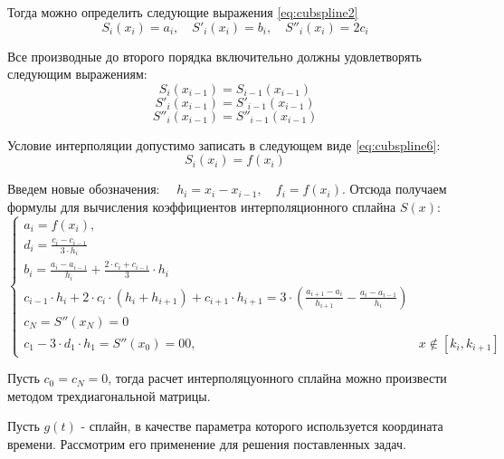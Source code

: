 Тогда можно определить следующие выражения \ref{eq:cubspline2}
\begin{equation} \label{eq:cubspline1}
    S_i\left(x_i\right) = a_i, \quad S'_i(x_i) = b_i, \quad S''_i(x_i) = 2c_i
\end{equation}

Все производные до второго порядка включительно должны удовлетворять следующим выражениям:
\begin{equation} \label{eq:cubspline3}
    S_i\left(x_{i-1}\right) = S_{i-1}(x_{i-1})
\end{equation}
\begin{equation} \label{eq:cubspline4}
    S'_i\left(x_{i-1}\right) = S'_{i-1}(x_{i-1})
\end{equation}
\begin{equation} \label{eq:cubspline5}
    S''_i\left(x_{i-1}\right) = S''_{i-1}(x_{i-1})
\end{equation}

Условие интерполяции допустимо записать в следующем виде \ref{eq:cubspline6}:
\begin{equation} \label{eq:cubspline6}
    S_i\left(x_{i}\right) = f(x_{i})
\end{equation}

Введем новые обозначения: $\quad h_i = x_i - x_{i-1}, \quad f_{i} = f(x_{i})$. 
Отсюда получаем формулы для вычисления коэффициентов интерполяционного сплайна $S(x)$:
\begin{equation} \label{eq:cubspline7}
\begin{cases} 
a_{i} = f(x_{i}), \\ 
d_{i} = \frac{c_{i} - c_{i - 1}}{3 \cdot h_{i}} \\
b_{i} = \frac{a_{i} - a_{i - 1}}{h_{i}} + \frac{2 \cdot c_{i} + c_{i - 1}}{3} \cdot h_{i} \\
c_{i - 1} \cdot h_{i} + 2 \cdot c_{i} \cdot(h_{i} + h_{i+1}) + c_{i + 1} \cdot h_{i+1} = 3 \cdot \left(\frac{a_{i+1} - a_{i}}{h_{i+1}} - \frac{a_{i} - a_{i - 1}}{h_{i}}\right) \\
c_{N} = S''(x_{N}) = 0 \\
c_{1} - 3 \cdot d_{1} \cdot h_{1} = S''(x_{0}) = 0
0, & x \notin [k_i,k_{i+1}]
\end{cases}
\end{equation}

Пусть $c_{0} = c_{N} = 0$, тогда расчет интерполяцуонного сплайна можно произвести методом трехдиагональной матрицы.

Пусть $g(t)$ - сплайн, в качестве параметра которого используется координата времени. Рассмотрим его применение для решения поставленных задач.

